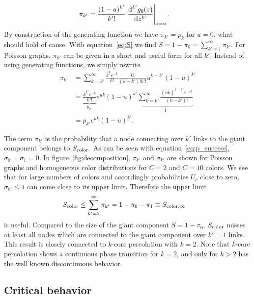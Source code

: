 \documentclass[aps, pre, onecolumn, a4paper, floatfix]{revtex4}
\begin{document}
\begin{align}
\pi_{k'} &= \frac{(1-u)^{k'}}{k'!}\left.\frac{{\rm d}^{k'}g_0(z)}{{\rm d}z^{k'}}\right|_{z=u}.
\end{align}
By construction of the generating function we have $\pi_{k'}=p_k$ for $u=0$, 
what should hold of cause. 
With equation~\ref{eq:S} we find $S=1-\pi_0=\sum_{k'=1}^{\infty}\pi_{k'}$. 
For Poisson graphs, $\pi_{k'}$ can be given in a short and useful form for all $k'$. 
Instead of using generating functions, we simply rewrite 
\begin{align}
\pi_{k'} &= \sum_{k=k'}^{\infty} \frac{{\bar k}^k e^{-{\bar k}}}{k!} \frac{k!}{(k-k')!k'!}u^{k-k'}(1-u)^{k'}\\
 &= \underbrace{ \frac{{\bar k}^{k'} e^{-{\bar k}}}{k'!}}_{p_{k'}} e^{u \bar k} (1-u)^{k'}
 \underbrace{ \sum_{k=k'}^{\infty} \frac{({u\bar k})^{k-k'} e^{-{u\bar k}}}{(k-k')!}}_{1}\\
 &= p_{k'} e^{u \bar k} (1-u)^{k'}.
\end{align}

The term $\sigma_{k'}$ is the probability that a node 
connecting over $k'$ links to the giant component belongs to $S_{\rm color}$. 
As can be seen with equation~\ref{eq:p_success}, $\sigma_0=\sigma_1=0$. 
In figure~\ref{fig:decomposition}, $\pi_{k'}$ and $\sigma_{k'}$ are shown 
for Poisson graphs and homogeneous color distributions for $C=2$ and $C=10$ colors. 
We see that for large numbers of colors and accordingly probabilities $U_{\bar c}$ close to zero, 
$\sigma_{k'}\leq 1$ can come close to its upper limit. 
Therefore the upper limit 
\begin{align}
S_{\rm color}\leq \sum_{k'=2}^{\infty} \pi_{k'} = 1-\pi_0-\pi_1 &\equiv S_{\rm color,\infty} 
\end{align}
is useful. Compared to the size of the giant component $S=1-\pi_0$, 
$S_{\rm color}$ misses at least all nodes 
which are connected to the giant component over $k'=1$ links. 
This result is closely connected to $k$-core percolation with $k=2$. 
Note that $k$-core percolation shows a continuous phase transition for $k=2$, 
and only for $k>2$ has the well known discontinuous behavior. 





\subsection{Critical behavior}
\end{document}
